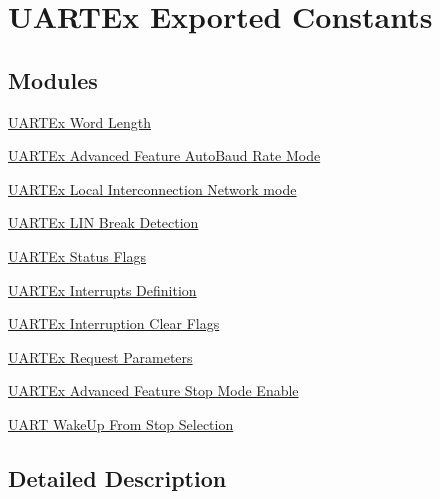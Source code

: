 \hypertarget{group___u_a_r_t_ex___exported___constants}{}\section{U\+A\+R\+T\+Ex Exported Constants}
\label{group___u_a_r_t_ex___exported___constants}
\subsection*{Modules}
\begin{DoxyCompactItemize}
\item 
\hyperlink{group___u_a_r_t_ex___word___length}{U\+A\+R\+T\+Ex Word Length}
\item 
\hyperlink{group___u_a_r_t_ex___auto_baud___rate___mode}{U\+A\+R\+T\+Ex Advanced Feature Auto\+Baud Rate Mode}
\item 
\hyperlink{group___u_a_r_t_ex___l_i_n}{U\+A\+R\+T\+Ex Local Interconnection Network mode}
\item 
\hyperlink{group___u_a_r_t_ex___l_i_n___break___detection}{U\+A\+R\+T\+Ex L\+I\+N Break Detection}
\item 
\hyperlink{group___u_a_r_t___flags}{U\+A\+R\+T\+Ex Status Flags}
\item 
\hyperlink{group___u_a_r_t___interrupt__definition}{U\+A\+R\+T\+Ex Interrupts Definition}
\item 
\hyperlink{group___u_a_r_t___i_t___c_l_e_a_r___flags}{U\+A\+R\+T\+Ex Interruption Clear Flags}
\item 
\hyperlink{group___u_a_r_t___request___parameters}{U\+A\+R\+T\+Ex Request Parameters}
\item 
\hyperlink{group___u_a_r_t___stop___mode___enable}{U\+A\+R\+T\+Ex Advanced Feature Stop Mode Enable}
\item 
\hyperlink{group___u_a_r_t___wake_up__from___stop___selection}{U\+A\+R\+T Wake\+Up From Stop Selection}
\end{DoxyCompactItemize}


\subsection{Detailed Description}
